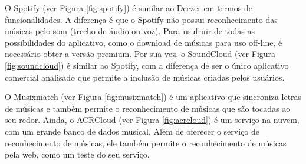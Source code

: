 O Spotify (ver Figura \ref{fig:spotify}) é similar ao Deezer em termos de funcionalidades. A diferença é que o Spotify não possui reconhecimento das músicas pelo som (trecho de áudio ou voz). Para usufruir de todas as possibilidades do aplicativo, como o download de músicas para uso off-line, é necessário obter a versão premium. Por sua vez, o SoundCloud (ver Figura \ref{fig:soundcloud}) é similar ao Spotify, com a diferença de ser o único aplicativo comercial analisado que permite a inclusão de músicas criadas pelos usuários.

O Musixmatch (ver Figura \ref{fig:musixmatch}) é um aplicativo que sincroniza letras de músicas e também permite o reconhecimento de músicas que são tocadas ao seu redor. Ainda, o ACRCloud (ver Figura \ref{fig:acrcloud}) é um serviço na nuvem, com um grande banco de dados musical. Além de oferecer o serviço de reconhecimento de músicas, ele também permite o reconhecimento de músicas pela web, como um teste do seu serviço.

